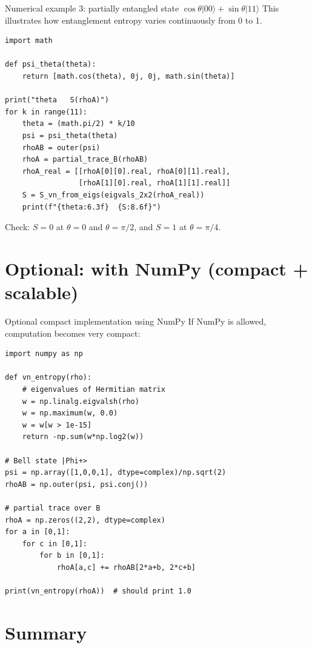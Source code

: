 \documentclass{beamer}
\begin{document}
\begin{frame}[fragile]{Numerical example 3: partially entangled state $\cos\theta|00\rangle+\sin\theta|11\rangle$}
This illustrates how entanglement entropy varies continuously from 0 to 1.
\begin{lstlisting}
import math

def psi_theta(theta):
    return [math.cos(theta), 0j, 0j, math.sin(theta)]

print("theta   S(rhoA)")
for k in range(11):
    theta = (math.pi/2) * k/10
    psi = psi_theta(theta)
    rhoAB = outer(psi)
    rhoA = partial_trace_B(rhoAB)
    rhoA_real = [[rhoA[0][0].real, rhoA[0][1].real],
                 [rhoA[1][0].real, rhoA[1][1].real]]
    S = S_vn_from_eigs(eigvals_2x2(rhoA_real))
    print(f"{theta:6.3f}  {S:8.6f}")
\end{lstlisting}
Check: $S=0$ at $\theta=0$ and $\theta=\pi/2$, and $S=1$ at $\theta=\pi/4$.
\end{frame}

\section{Optional: with NumPy (compact + scalable)}

\begin{frame}[fragile]{Optional compact implementation using NumPy}
If NumPy is allowed, computation becomes very compact:
\begin{lstlisting}
import numpy as np

def vn_entropy(rho):
    # eigenvalues of Hermitian matrix
    w = np.linalg.eigvalsh(rho)
    w = np.maximum(w, 0.0)
    w = w[w > 1e-15]
    return -np.sum(w*np.log2(w))

# Bell state |Phi+>
psi = np.array([1,0,0,1], dtype=complex)/np.sqrt(2)
rhoAB = np.outer(psi, psi.conj())

# partial trace over B
rhoA = np.zeros((2,2), dtype=complex)
for a in [0,1]:
    for c in [0,1]:
        for b in [0,1]:
            rhoA[a,c] += rhoAB[2*a+b, 2*c+b]

print(vn_entropy(rhoA))  # should print 1.0
\end{lstlisting}
\end{frame}

\section{Summary}
\end{document}
